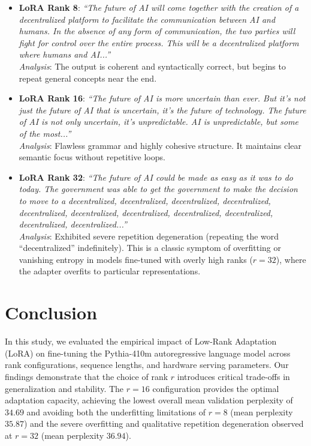 \documentclass[11pt,a4paper]{article}
\begin{document}
\begin{itemize}
    \item \textbf{LoRA Rank 8}:
    \textit{``The future of AI will come together with the creation of a decentralized platform to facilitate the communication between AI and humans. In the absence of any form of communication, the two parties will fight for control over the entire process. This will be a decentralized platform where humans and AI...''}
    \\ \textit{Analysis}: The output is coherent and syntactically correct, but begins to repeat general concepts near the end.
    
    \item \textbf{LoRA Rank 16}:
    \textit{``The future of AI is more uncertain than ever. But it's not just the future of AI that is uncertain, it’s the future of technology. The future of AI is not only uncertain, it’s unpredictable. AI is unpredictable, but some of the most...''}
    \\ \textit{Analysis}: Flawless grammar and highly cohesive structure. It maintains clear semantic focus without repetitive loops.
    
    \item \textbf{LoRA Rank 32}:
    \textit{``The future of AI could be made as easy as it was to do today. The government was able to get the government to make the decision to move to a decentralized, decentralized, decentralized, decentralized, decentralized, decentralized, decentralized, decentralized, decentralized, decentralized, decentralized...''}
    \\ \textit{Analysis}: Exhibited severe repetition degeneration (repeating the word ``decentralized'' indefinitely). This is a classic symptom of overfitting or vanishing entropy in models fine-tuned with overly high ranks ($r=32$), where the adapter overfits to particular representations.
\end{itemize}

\section{Conclusion}
In this study, we evaluated the empirical impact of Low-Rank Adaptation (LoRA) on fine-tuning the Pythia-410m autoregressive language model across rank configurations, sequence lengths, and hardware serving parameters. Our findings demonstrate that the choice of rank $r$ introduces critical trade-offs in generalization and stability. The $r=16$ configuration provides the optimal adaptation capacity, achieving the lowest overall mean validation perplexity of $34.69$ and avoiding both the underfitting limitations of $r=8$ (mean perplexity $35.87$) and the severe overfitting and qualitative repetition degeneration observed at $r=32$ (mean perplexity $36.94$). 
\end{document}
